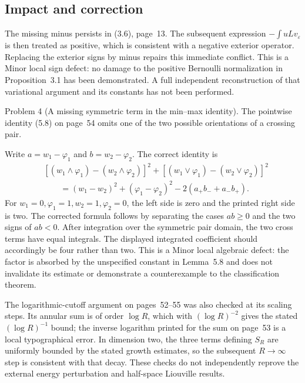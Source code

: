 \documentclass[10pt]{article}
\begin{document}
\subsection*{Impact and correction}
The missing minus persists in (3.6), page 13. The subsequent expression \(-\int uLv_\varepsilon\) is then treated as positive, which is consistent with a negative exterior operator. Replacing the exterior signs by minus repairs this immediate conflict. This is a Minor local sign defect: no damage to the positive Bernoulli normalization in Proposition 3.1 has been demonstrated. A full independent reconstruction of that variational argument and its constants has not been performed.\par
Problem 4 (A missing symmetric term in the min–max identity).  The pointwise identity (5.8) on page 54 omits one of the two possible orientations of a crossing pair.\par
Write \(a=w_1-\varphi_1\) and \(b=w_2-\varphi_2\). The correct identity is \[\begin{split}
 &[(w_1\wedge\varphi_1)-(w_2\wedge\varphi_2)]^2
 +[(w_1\vee\varphi_1)-(w_2\vee\varphi_2)]^2\\
 &\qquad=(w_1-w_2)^2+(\varphi_1-\varphi_2)^2
              -2(a_+b_-+a_-b_+).
\end{split}\] For \(w_1=0,\varphi_1=1,w_2=1,\varphi_2=0\), the left side is zero and the printed right side is two. The corrected formula follows by separating the cases \(ab\ge0\) and the two signs of \(ab<0\). After integration over the symmetric pair domain, the two cross terms have equal integrals. The displayed integrated coefficient should accordingly be four rather than two. This is a Minor local algebraic defect: the factor is absorbed by the unspecified constant in Lemma 5.8 and does not invalidate its estimate or demonstrate a counterexample to the classification theorem.\par
The logarithmic-cutoff argument on pages 52–55 was also checked at its scaling steps. Its annular sum is of order \(\log R\), which with \((\log R)^{-2}\) gives the stated \((\log R)^{-1}\) bound; the inverse logarithm printed for the sum on page 53 is a local typographical error. In dimension two, the three terms defining \(S_R\) are uniformly bounded by the stated growth estimates, so the subsequent \(R\to\infty\) step is consistent with that decay. These checks do not independently reprove the external energy perturbation and half-space Liouville results.\par
\end{document}

